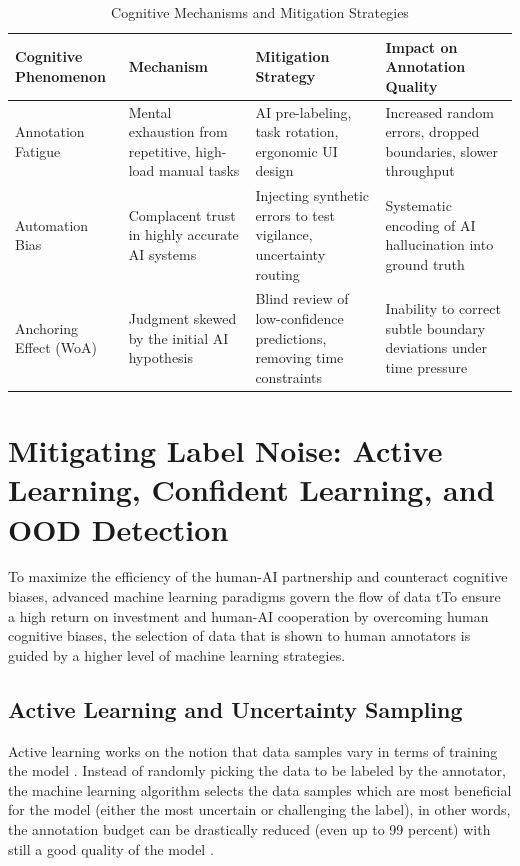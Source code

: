 \documentclass[10pt, conference, letterpaper]{IEEEtran}
\begin{document}
\begin{table}[!t]
\centering
\caption{Cognitive Mechanisms and Mitigation Strategies}
\label{tab:cognitive}
\footnotesize
\renewcommand{\arraystretch}{1.25}
\begin{tabularx}{\textwidth}{@{} >{\raggedright\arraybackslash}p{} >{\raggedright\arraybackslash}X >{\raggedright\arraybackslash}X >{\raggedright\arraybackslash}X @{}}
\toprule
\textbf{Cognitive Phenomenon} & \textbf{Mechanism} & \textbf{Mitigation Strategy} & \textbf{Impact on Annotation Quality} \\
\midrule
Annotation Fatigue & Mental exhaustion from repetitive, high-load manual tasks & AI pre-labeling, task rotation, ergonomic UI design & Increased random errors, dropped boundaries, slower throughput \\
\addlinespace
Automation Bias & Complacent trust in highly accurate AI systems & Injecting synthetic errors to test vigilance, uncertainty routing & Systematic encoding of AI hallucination into ground truth \\
\addlinespace
Anchoring Effect (WoA) & Judgment skewed by the initial AI hypothesis & Blind review of low-confidence predictions, removing time constraints & Inability to correct subtle boundary deviations under time pressure \\
\bottomrule
\end{tabularx}
\end{table}

\section{Mitigating Label Noise: Active Learning, Confident Learning, and OOD Detection}
\label{sec:noise}
To maximize the efficiency of the human-AI partnership and counteract cognitive biases, advanced machine learning paradigms govern the flow of data tTo ensure a high return on investment and human-AI cooperation by overcoming human cognitive biases, the selection of data that is shown to human annotators is guided by a higher level of machine learning strategies.

\subsection{Active Learning and Uncertainty Sampling}
Active learning works on the notion that data samples vary in terms of training the model \cite{ref73}. Instead of randomly picking the data to be labeled by the annotator, the machine learning algorithm selects the data samples which are most beneficial for the model (either the most uncertain or challenging the label), in other words, the annotation budget can be drastically reduced (even up to 99 percent) with still a good quality of the model \cite{ref64}.
\end{document}
